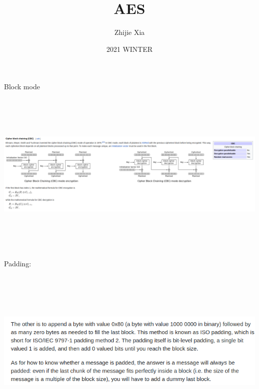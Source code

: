 \documentclass[28pt]{article}
\author{Zhijie Xia}
\title{AES}
\date{2021 WINTER}
\begin{document}
    Block mode
    
    \includegraphics[width=180mm,height=80mm]{CBC.png}
    
    Padding:

    \includegraphics[width=150mm,height=80mm]{ISO_IEC9797_1Padding.png}
\end{document}
